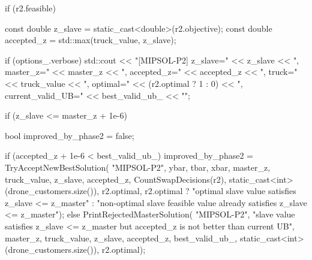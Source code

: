 {{{{                if (r2.feasible)
                {
                    const double z_slave = static_cast<double>(r2.objective);
                    const double accepted_z = std::max(truck_value, z_slave);

                    if (options_.verbose)
                    {
                        std::cout << "[MIPSOL-P2] z_slave=" << z_slave
                                  << ", master_z=" << master_z
                                  << ", accepted_z=" << accepted_z
                                  << ", truck=" << truck_value
                                  << ", optimal=" << (r2.optimal ? 1 : 0)
                                  << ", current_valid_UB=" << best_valid_ub_
                                  << "\n";
                    }

                    if (z_slave <= master_z + 1e-6)
                    {
                        bool improved_by_phase2 = false;

                        if (accepted_z + 1e-6 < best_valid_ub_)
                        {
                            improved_by_phase2 = TryAcceptNewBestSolution(
                                "MIPSOL-P2",
                                ybar,
                                tbar,
                                xbar,
                                master_z,
                                truck_value,
                                z_slave,
                                accepted_z,
                                CountSwapDecisions(r2),
                                static_cast<int>(drone_customers.size()),
                                r2.optimal,
                                r2.optimal
                                    ? "optimal slave value satisfies z_slave <= z_master"
                                    : "non-optimal slave feasible value already satisfies z_slave <= z_master");
                        }
                        else
                        {
                            PrintRejectedMasterSolution(
                                "MIPSOL-P2",
                                "slave value satisfies z_slave <= z_master but accepted_z is not better than current UB",
                                master_z,
                                truck_value,
                                z_slave,
                                accepted_z,
                                best_valid_ub_,
                                static_cast<int>(drone_customers.size()),
                                r2.optimal);
                        }

}}}}}}
